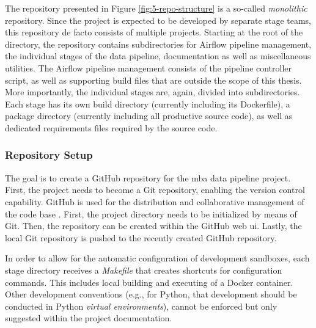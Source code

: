 The repository presented in Figure \ref{fig:5-repo-structure} is a so-called \textit{monolithic} repository. Since the project is expected to be developed by separate stage teams, this repository de facto consists of multiple projects. Starting at the root of the directory, the repository contains subdirectories for Airflow pipeline management, the individual stages of the data pipeline, documentation as well as miscellaneous utilities. The Airflow pipeline management consists of the pipeline controller script, as well as supporting build files that are outside the scope of this thesis. More importantly, the individual stages are, again, divided into subdirectories. Each stage has its own build directory (currently including its Dockerfile), a package directory (currently including all productive source code), as well as dedicated requirements files required by the source code.

\subsubsection{Repository Setup}
The goal is to create a GitHub repository for the \ac{mba} data pipeline project. First, the project needs to become a Git repository, enabling the version control capability. GitHub is used for the distribution and collaborative management of the code base \cite[25\psqq]{Chacon2020}\cite{github}. First, the project directory needs to be initialized by means of Git. Then, the repository can be created within the GitHub web \ac{ui}. Lastly, the local Git repository is pushed to the recently created GitHub repository.

In order to allow for the automatic configuration of development sandboxes, each stage directory receives a \textit{Makefile} that creates shortcuts for configuration commands. This includes local building and executing of a Docker container. Other development conventions (e.g., for Python, that development should be conducted in Python \textit{virtual environments}), cannot be enforced but only suggested within the project documentation.


